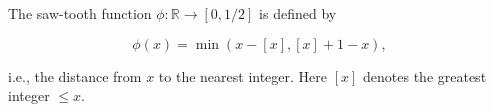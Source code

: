 The saw-tooth function $\phi : \mathbb{R} \to [0, 1/2]$ is defined by

$$\phi(x) = \min(x - [x], [x] + 1 - x),$$

i.e., the distance from $x$ to the nearest integer. Here $[x]$ denotes the greatest integer $\leq x$.
